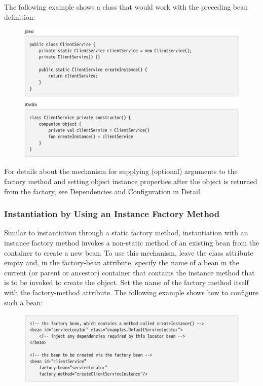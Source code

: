 The following example shows a class that would work with the preceding bean definition:

\begin{figure}[ht]
    \centering
    \includegraphics[width=1\linewidth]{./Figure/IMG_code_16.png}
\end{figure}

For details about the mechanism for supplying (optional) arguments to the factory method and
setting object instance properties after the object is returned from the factory, see Dependencies
and Configuration in Detail.

\subsubsection{Instantiation by Using an Instance Factory Method}
Similar to instantiation through a static factory method, instantiation with an instance factory
method invokes a non-static method of an existing bean from the container to create a new bean.
To use this mechanism, leave the class attribute empty and, in the factory-bean attribute, specify
the name of a bean in the current (or parent or ancestor) container that contains the instance
method that is to be invoked to create the object. Set the name of the factory method itself with the
factory-method attribute. The following example shows how to configure such a bean:

\begin{figure}[ht]
    \centering
    \includegraphics[width=1\linewidth]{./Figure/IMG_code_17.png}
\end{figure}

